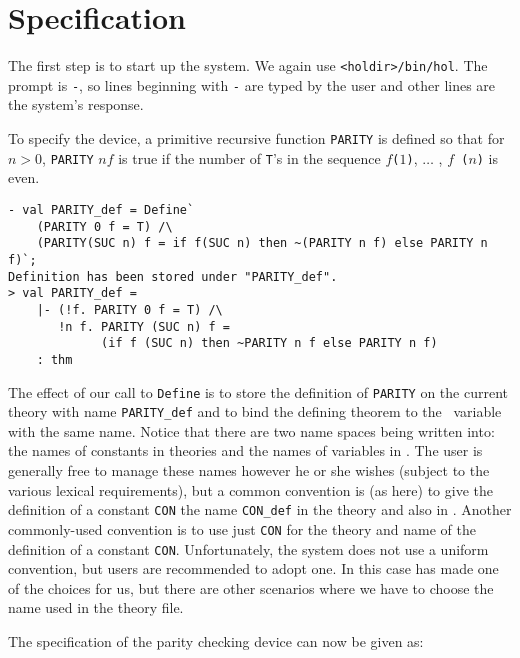\section{Specification}
\label{example}
The first step is to start up the \HOL{} system.  We again use
\texttt{<holdir>/bin/hol}.  The \ML{} prompt is {\small\verb|-|}, so
lines beginning with {\small\verb|-|} are typed by the user and other
lines are the system's response.

To specify the device, a primitive recursive function
{\small\verb|PARITY|} is defined so that for $n>0$, {\small\tt PARITY}
$n f$ is true if the number of {\small\verb|T|}'s in the sequence
$f${\small\tt (}$1${\small\tt)}, $\ldots$ , $f${\small\tt
  (}$n${\small\tt)} is even.

\setcounter{sessioncount}{0}
\begin{session}
\begin{verbatim}
- val PARITY_def = Define`
    (PARITY 0 f = T) /\
    (PARITY(SUC n) f = if f(SUC n) then ~(PARITY n f) else PARITY n f)`;
Definition has been stored under "PARITY_def".
> val PARITY_def =
    |- (!f. PARITY 0 f = T) /\
       !n f. PARITY (SUC n) f =
             (if f (SUC n) then ~PARITY n f else PARITY n f)
    : thm
\end{verbatim}
\end{session}

\noindent

The effect of our call to {\small\verb|Define|} is to store the
definition of {\small\verb|PARITY|} on the current theory with name
{\small\verb|PARITY_def|} and to bind the defining theorem to the \ML\
variable with the same name.  Notice that there are two name spaces
being written into: the names of constants in theories and the names
of variables in \ML.  The user is generally free to manage these names
however he or she wishes (subject to the various lexical
requirements), but a common convention is (as here) to give the
definition of a constant {\small\tt CON} the name
{\small\verb|CON_def|} in the theory and also in \ML.  Another
commonly-used convention is to use just {\small\verb|CON|} for the
theory and \ML{} name of the definition of a constant
{\small\verb|CON|}.  Unfortunately, the \HOL{} system does not use a
uniform convention, but users are recommended to adopt one.  In this
case \ml{Define} has made one of the choices for us, but there are
other scenarios where we have to choose the name used in the theory
file.

The specification of the parity checking device can now be given as:

